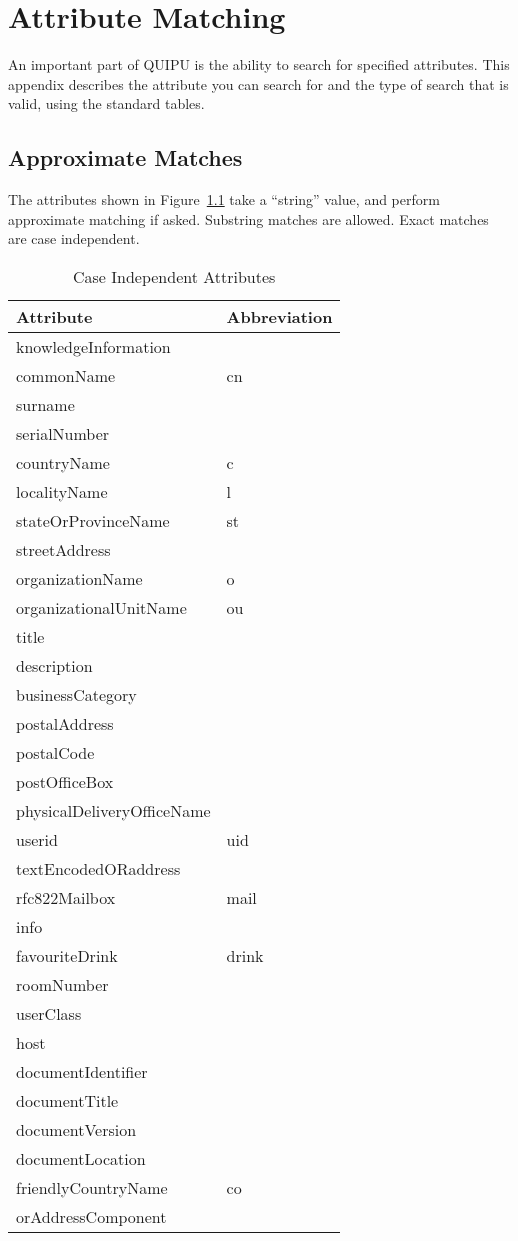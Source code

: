 
\chapter {Attribute Matching}
\label{attr_match}

An important part of QUIPU is the ability to search for specified attributes.
This appendix describes the attribute you can search for and the type of
search that is valid, using the standard tables.

\section {Approximate Matches}
The attributes shown in Figure~\ref{case_ignore} take a ``string'' value, 
and perform approximate matching if asked.
Substring matches are allowed.
Exact matches are case independent.

\begin{table}
\centering
\begin{tabular}{|l|l|} \hline
Attribute & Abbreviation \\ \hline
knowledgeInformation & \\
commonName & cn\\
surname &\\
serialNumber &\\
countryName & c \\
localityName  & l\\
stateOrProvinceName & st\\
streetAddress &\\
organizationName & o\\
organizationalUnitName & ou\\
title &\\
description &\\
businessCategory &\\
postalAddress  &\\
postalCode &\\
postOfficeBox &\\
physicalDeliveryOfficeName &\\
userid & uid\\
textEncodedORaddress &\\
rfc822Mailbox & mail\\
info &\\
favouriteDrink & drink\\
roomNumber &\\
userClass  &\\
host &\\
documentIdentifier &\\
documentTitle &\\
documentVersion  &\\
documentLocation &\\
friendlyCountryName & co\\
orAddressComponent &\\\hline
\end{tabular}
\caption{Case Independent Attributes}
\label{case_ignore}
\end{table}

